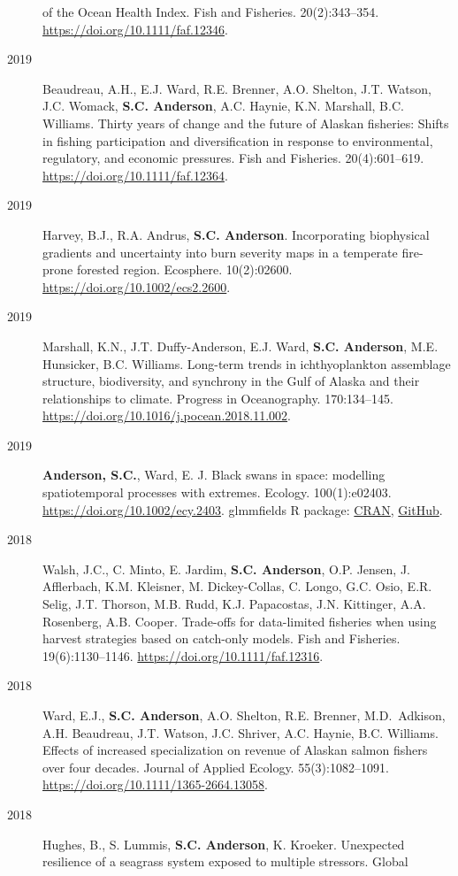\begin{description}
of the Ocean Health Index. Fish and Fisheries. 20(2):343--354.
\url{https://doi.org/10.1111/faf.12346}.
\item[2019]
Beaudreau, A.H., E.J. Ward, R.E. Brenner, A.O. Shelton, J.T. Watson,
J.C. Womack, \textbf{S.C. Anderson}, A.C. Haynie, K.N. Marshall, B.C.
Williams. Thirty years of change and the future of Alaskan fisheries:
Shifts in fishing participation and diversification in response to
environmental, regulatory, and economic pressures. Fish and Fisheries.
20(4):601--619. \url{https://doi.org/10.1111/faf.12364}.
\item[2019]
Harvey, B.J., R.A. Andrus, \textbf{S.C. Anderson}. Incorporating
biophysical gradients and uncertainty into burn severity maps in a
temperate fire-prone forested region. Ecosphere. 10(2):02600.
\url{https://doi.org/10.1002/ecs2.2600}.
\item[2019]
Marshall, K.N., J.T. Duffy-Anderson, E.J. Ward, \textbf{S.C. Anderson},
M.E. Hunsicker, B.C. Williams. Long-term trends in ichthyoplankton
assemblage structure, biodiversity, and synchrony in the Gulf of Alaska
and their relationships to climate. Progress in Oceanography.
170:134--145. \url{https://doi.org/10.1016/j.pocean.2018.11.002}.
\item[2019]
\textbf{Anderson, S.C.}, Ward, E. J. Black swans in space: modelling
spatiotemporal processes with extremes. Ecology. 100(1):e02403.
\url{https://doi.org/10.1002/ecy.2403}. glmmfields R package:
\href{https://cran.r-project.org/package=glmmfields}{CRAN},
\href{https://github.com/seananderson/glmmfields}{GitHub}.
\item[2018]
Walsh, J.C., C. Minto, E. Jardim, \textbf{S.C. Anderson}, O.P. Jensen,
J. Afflerbach, K.M. Kleisner, M. Dickey-Collas, C. Longo, G.C. Osio,
E.R. Selig, J.T. Thorson, M.B. Rudd, K.J. Papacostas, J.N. Kittinger,
A.A. Rosenberg, A.B. Cooper. Trade-offs for data-limited fisheries when
using harvest strategies based on catch-only models. Fish and Fisheries.
19(6):1130--1146. \url{https://doi.org/10.1111/faf.12316}.
\item[2018]
Ward, E.J., \textbf{S.C. Anderson}, A.O. Shelton, R.E. Brenner,
M.D.\ Adkison, A.H. Beaudreau, J.T. Watson, J.C. Shriver, A.C. Haynie,
B.C. Williams. Effects of increased specialization on revenue of Alaskan
salmon fishers over four decades. Journal of Applied Ecology.
55(3):1082--1091. \url{https://doi.org/10.1111/1365-2664.13058}.
\item[2018]
Hughes, B., S. Lummis, \textbf{S.C. Anderson}, K. Kroeker. Unexpected
resilience of a seagrass system exposed to multiple stressors. Global

\end{description}
